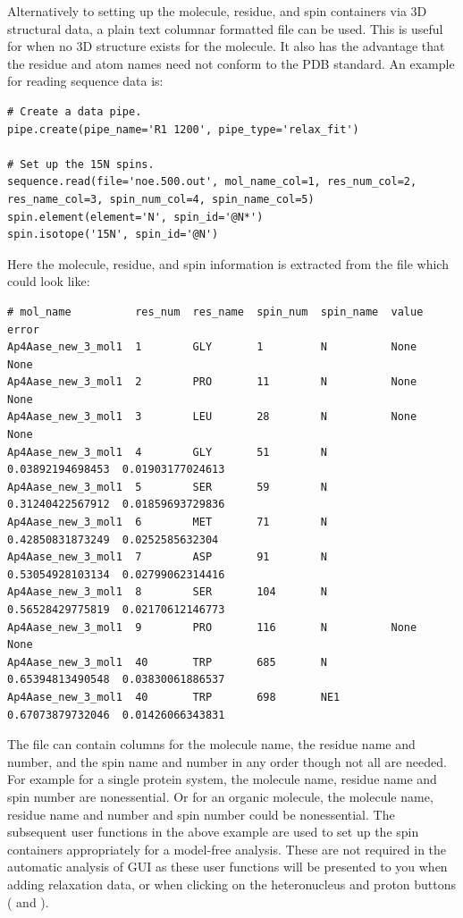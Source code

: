 Alternatively to setting up the molecule, residue, and spin containers via 3D structural data, a plain text columnar formatted file can be used.
This is useful for when no 3D structure exists for the molecule.
It also has the advantage that the residue and atom names need not conform to the PDB standard.
An example for reading sequence data is:

\begin{lstlisting}
# Create a data pipe.
pipe.create(pipe_name='R1 1200', pipe_type='relax_fit')

# Set up the 15N spins.
sequence.read(file='noe.500.out', mol_name_col=1, res_num_col=2, res_name_col=3, spin_num_col=4, spin_name_col=5)
spin.element(element='N', spin_id='@N*')
spin.isotope('15N', spin_id='@N')
\end{lstlisting}

Here the molecule, residue, and spin information is extracted from the  file which could look like:

{\scriptsize \begin{verbatim}
# mol_name          res_num  res_name  spin_num  spin_name  value             error               
Ap4Aase_new_3_mol1  1        GLY       1         N          None              None                
Ap4Aase_new_3_mol1  2        PRO       11        N          None              None                
Ap4Aase_new_3_mol1  3        LEU       28        N          None              None                
Ap4Aase_new_3_mol1  4        GLY       51        N          0.03892194698453  0.01903177024613    
Ap4Aase_new_3_mol1  5        SER       59        N          0.31240422567912  0.01859693729836    
Ap4Aase_new_3_mol1  6        MET       71        N          0.42850831873249  0.0252585632304     
Ap4Aase_new_3_mol1  7        ASP       91        N          0.53054928103134  0.02799062314416    
Ap4Aase_new_3_mol1  8        SER       104       N          0.56528429775819  0.02170612146773    
Ap4Aase_new_3_mol1  9        PRO       116       N          None              None                
Ap4Aase_new_3_mol1  40       TRP       685       N          0.65394813490548  0.03830061886537    
Ap4Aase_new_3_mol1  40       TRP       698       NE1        0.67073879732046  0.01426066343831    
\end{verbatim}} \label{verb: noe.500.out}

The file can contain columns for the molecule name, the residue name and number, and the spin name and number in any order though not all are needed.
For example for a single protein system, the molecule name, residue name and spin number are nonessential.
Or for an organic molecule, the molecule name, residue name and number and spin number could be nonessential.
The subsequent user functions in the above example are used to set up the spin containers appropriately for a model-free analysis.
These are not required in the automatic analysis of GUI as these user functions will be presented to you when adding relaxation data, or when clicking on the heteronucleus and proton buttons ( and ).

